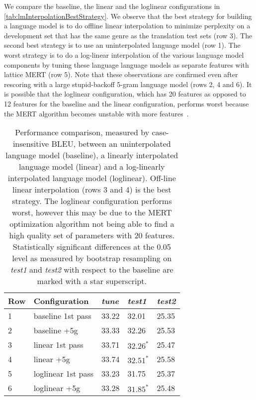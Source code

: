 We compare the baseline, the linear and the loglinear configurations
in \autoref{tab:lmInterpolationBestStrategy}.
We observe that the best strategy for
building a language model is to do offline linear interpolation to minimize
perplexity on a development set that has the same genre as the translation
test sets (row 3). The second best strategy is to use an uninterpolated
language model (row 1). The worst strategy is to do a log-linear interpolation
of the various language model components by tuning these language
language models as separate features with lattice MERT (row 5). Note that
these observations are confirmed even after rescoring with a large
stupid-backoff 5-gram language model (rows 2, 4 and 6).
It is possible that the loglinear configuration, which has 20 features as opposed
to 12 features for the baseline and the linear configuration, performs worst because
the MERT algorithm
becomes unstable with more features~\citep{foster-kuhn:2009:WMT}.
%
\begin{table}
  \begin{center}
    \begin{tabular}{l|l|lll}
      Row & Configuration & \emph{tune} & \emph{test1} & \emph{test2} \\
      \hline
      1 & baseline 1st pass & 33.22 & 32.01 & 25.35 \\
      2 & baseline +5g & 33.33 & 32.26 & 25.53 \\
      \hline
      3 & linear 1st pass & 33.71 & $32.26^*$ & 25.47 \\
      4 & linear +5g & 33.74 & $32.51^*$ & 25.58 \\
      \hline
      5 & loglinear 1st pass & 33.23 & 31.75 & 25.37 \\
      6 & loglinear +5g & 33.28 & $31.85^*$ & 25.48
    \end{tabular}
    \caption{Performance comparison, measured by case-insensitive BLEU, between an uninterpolated language model (baseline), a
    linearly interpolated language model (linear) and a log-linearly interpolated language model (loglinear).
    Off-line linear interpolation (rows 3 and 4) is the best strategy. The loglinear configuration performs worst, however this
    may be due to the MERT optimization algorithm not being able to find a high quality
    set of parameters with 20 features. Statistically significant differences at the
    0.05 level as measured by bootstrap resampling on \emph{test1} and \emph{test2}
    with respect to the baseline are marked with a star superscript.}
    \label{tab:lmInterpolationBestStrategy}
  \end{center}
\end{table}
%


